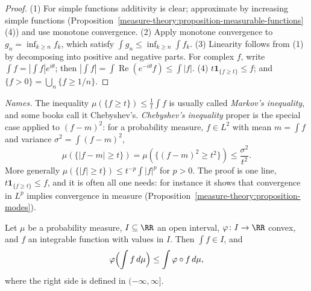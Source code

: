 \begin{proof}
(1) For simple functions additivity is clear; approximate by increasing simple functions (Proposition~\ref{measure-theory:proposition-measurable-functions}(4)) and use monotone convergence. (2) Apply
monotone convergence to $g_n = \inf_{k \geq n}f_k$, which satisfy $\int g_n \leq \inf_{k \geq n}\int f_k$. (3) Linearity follows from (1) by decomposing into positive and negative parts. For complex $f$, write
$\int f = |\int f|e^{i\theta}$; then $|\int f| = \int\operatorname{Re}(e^{-i\theta}f) \leq \int|f|$. (4) $t\mathbf{1}_{\{f \geq t\}} \leq f$; and $\{f > 0\} = \bigcup_n\{f \geq 1/n\}$.
\end{proof}

\begin{remark}\label{measure-theory:remark-markov-chebyshev}
\emph{Names.} The inequality $\mu(\{f \geq t\}) \leq \frac1t\int f$ is usually called \emph{Markov's inequality}, and some books call it Chebyshev's. \emph{Chebyshev's inequality} proper is the
special case applied to $(f - m)^2$: for a probability measure, $f \in L^2$ with mean $m = \int f$ and variance $\sigma^2 = \int(f - m)^2$,
\[
\mu(\{|f - m| \geq t\}) = \mu(\{(f - m)^2 \geq t^2\}) \leq \frac{\sigma^2}{t^2}.
\]
More generally $\mu(\{|f| \geq t\}) \leq t^{-p}\int|f|^p$ for $p > 0$. The proof is one line, $t\mathbf{1}_{\{f \geq t\}} \leq f$, and it is often all one needs: for instance it shows that
convergence in $L^p$ implies convergence in measure (Proposition~\ref{measure-theory:proposition-modes}).
\end{remark}

\begin{proposition}\label{measure-theory:proposition-jensen}
Let $\mu$ be a probability measure, $I \subseteq \RR$ an open interval, $\varphi \colon I \to \RR$ convex, and $f$ an integrable function with values in $I$. Then $\int f \in I$, and
\[
\varphi\Bigl(\int f\,d\mu\Bigr) \leq \int\varphi \circ f\,d\mu,
\]
where the right side is defined in $(-\infty, \infty]$.
\end{proposition}

